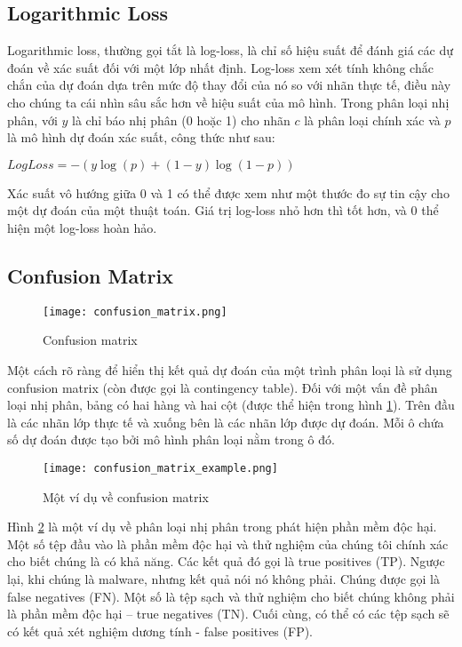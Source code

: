 \subsection{Logarithmic Loss}

Logarithmic loss, thường gọi tắt là log-loss, là chỉ số hiệu suất để đánh giá các dự đoán về xác suất đối với một lớp nhất định. Log-loss xem xét tính không chắc chắn của dự đoán dựa trên mức độ thay đổi của nó so với nhãn thực tế, điều này cho chúng ta cái nhìn sâu sắc hơn về hiệu suất của mô hình.
Trong phân loại nhị phân, với $y$ là chỉ báo nhị phân (0 hoặc 1) cho nhãn $c$ là phân loại chính xác và $p$ là mô hình dự đoán xác suất, công thức như sau:

\bigskip
\begin{center}
    $LogLoss = -(y\log(p) + (1 - y)\log(1 - p))$
\end{center}
\bigskip

Xác suất vô hướng giữa 0 và 1 có thể được xem như một thước đo sự tin cậy cho một dự đoán của một thuật toán.
Giá trị log-loss nhỏ hơn thì tốt hơn, và 0 thể hiện một log-loss hoàn hảo.

\subsection{Confusion Matrix}
\label{ssec:confusion_matrix}

\begin{figure}[H]
    \centering    
    \texttt{[image: confusion\_matrix.png]}
    \caption{Confusion matrix \cite{wiki_confusion_matrix}}
    \label{fig:confusion_matrix}
\end{figure}

Một cách rõ ràng để hiển thị kết quả dự đoán của một trình phân loại là sử dụng confusion matrix (còn được gọi là contingency table).
Đối với một vấn đề phân loại nhị phân, bảng có hai hàng và hai cột (được thể hiện trong hình \ref{fig:confusion_matrix}). 
Trên đầu là các nhãn lớp thực tế và xuống bên là các nhãn lớp được dự đoán.
Mỗi ô chứa số dự đoán được tạo bởi mô hình phân loại nằm trong ô đó.

\begin{figure}[H]
    \centering    
    \texttt{[image: confusion\_matrix\_example.png]}
    \caption{Một ví dụ về confusion matrix}
    \label{fig:confusion_matrix_example}
\end{figure}

Hình \ref{fig:confusion_matrix_example} là một ví dụ về phân loại nhị phân trong phát hiện phần mềm độc hại.
Một số tệp đầu vào là phần mềm độc hại và thử nghiệm của chúng tôi chính xác cho biết chúng là có khả năng. Các kết quả đó gọi là true positives (TP). 
Ngược lại, khi chúng là malware, nhưng kết quả nói nó không phải. Chúng được gọi là false negatives (FN). 
Một số là tệp sạch và thử nghiệm cho biết chúng không phải là phần mềm độc hại – true negatives (TN). 
Cuối cùng, có thể có các tệp sạch sẽ có kết quả xét nghiệm dương tính - false positives (FP).


